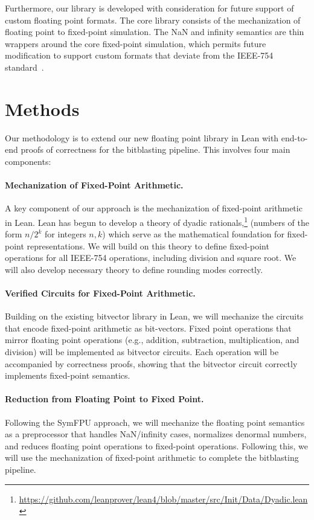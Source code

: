 \documentclass[onecolumn]{article}
\begin{document}
Furthermore, our library is developed with consideration for future support of custom floating point formats.
The core library consists of the mechanization of floating point to fixed-point simulation.
The NaN and infinity semantics are thin wrappers around the core fixed-point simulation,
which permits future modification to support custom formats that deviate from the IEEE-754 standard~\cite{micikevicius2022fp8, kim2025investigation}.
\section{Methods}

Our methodology is to extend our new floating point library in Lean
with end-to-end proofs of correctness for the bitblasting pipeline.
This involves four main components:

\paragraph{Mechanization of Fixed-Point Arithmetic.}
A key component of our approach is the mechanization of fixed-point arithmetic in Lean.
Lean has begun to develop a theory of dyadic rationals,\footnote{\url{https://github.com/leanprover/lean4/blob/master/src/Init/Data/Dyadic.lean}} (numbers of the form $n/2^k$ for integers $n,k$)
which serve as the mathematical foundation for fixed-point representations.
We will build on this theory to define fixed-point operations for all IEEE-754 operations,
including division and square root.
We will also develop necessary theory to define rounding modes correctly.

\paragraph{Verified Circuits for Fixed-Point Arithmetic.}
Building on the existing bitvector library in Lean,
we will mechanize the circuits that encode fixed-point arithmetic as bit-vectors.
Fixed point operations that mirror floating point operations (e.g., addition, subtraction, multiplication, and division)
will be implemented as bitvector circuits.
Each operation will be accompanied by correctness proofs,
showing that the bitvector circuit correctly implements fixed-point semantics.

\paragraph{Reduction from Floating Point to Fixed Point.}
Following the SymFPU approach,
we will mechanize the floating point semantics as a preprocessor that handles 
NaN/infinity cases, normalizes denormal numbers, and reduces floating point operations
to fixed-point operations. 
Following this, we will use the mechanization of fixed-point arithmetic to complete the bitblasting pipeline.
\end{document}
